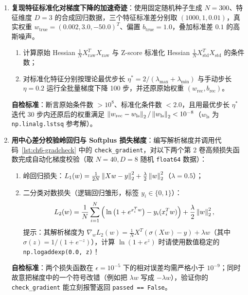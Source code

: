 \begin{enumerate}[label=\textbf{6.\arabic*}, resume]
  \item \textbf{复现特征标准化对梯度下降的加速奇迹}：使用固定随机种子生成 $N=300$、特征维度 $D=3$ 的合成回归数据，三个特征标准差分别取 $(1000, 1, 0.01)$，真实权重 $w_{\text{true}} = (0.002, 3.0, -50.0)^T$、偏置 $b_{\text{true}} = 1.0$，叠加标准差 $0.1$ 的高斯噪声。
  \begin{enumerate}[label=(\alph*)]
    \item 计算原始 Hessian $\frac{1}{N}X_{\text{raw}}^T X_{\text{raw}}$ 与 Z-score 标准化 Hessian $\frac{1}{N}X_{\text{std}}^T X_{\text{std}}$ 的条件数；
    \item 对标准化特征分别按理论最优步长 $\eta^* = 2/(\lambda_{\max}+\lambda_{\min})$ 与手动步长 $\eta = 0.2$ 运行全批量梯度下降 100 步，并还原原始权重 $(w_{\text{rec}}, b_{\text{rec}})$。
  \end{enumerate}
  \textbf{自检标准}：断言原始条件数 $> 10^8$、标准化条件数 $< 2.0$，且用最优步长 $\eta^*$ 迭代 30 步内还原后的权重满足 $\left\|w_{\text{rec}} - w_{\text{ls}}\right\|_2 / \left\|w_{\text{ls}}\right\|_2 < 10^{-8}$（$w_{\text{ls}}$ 为 \texttt{np.linalg.lstsq} 参考解）。

  \item \textbf{用中心差分校验岭回归与 Softplus 损失梯度}：编写解析梯度并调用代码~\ref{lst:ch6-gradcheck} 中的 \texttt{check\_gradient}，对以下两个第 2 卷高频损失函数完成自动化梯度校验（取 $N=40, D=8$ 随机 \texttt{float64} 数据）：
  \begin{enumerate}[label=(\alph*)]
    \item 岭回归损失：$L_1(w) = \frac{1}{2N}\left\|Xw - y\right\|_2^2 + \frac{\lambda}{2}\left\|w\right\|_2^2$（$\lambda = 0.5$）；
    \item 二分类对数损失（逻辑回归雏形，标签 $y_i\in\{0,1\}$）：
    \[
      L_2(w) = \frac{1}{N}\sum_{i=1}^N \Big(\ln\big(1 + e^{x_i^T w}\big) - y_i (x_i^T w)\Big) + \frac{\lambda}{2}\left\|w\right\|_2^2,
    \]
    提示：其解析梯度为 $\nabla_w L_2(w) = \frac{1}{N}X^T(\sigma(Xw) - y) + \lambda w$（其中 $\sigma(z)=1/(1+e^{-z})$），计算 $\ln(1+e^z)$ 时请使用数值稳定的 \texttt{np.logaddexp(0.0, z)}！
  \end{enumerate}
  \textbf{自检标准}：两个损失函数在 $\epsilon = 10^{-5}$ 下的相对误差均需严格小于 $10^{-9}$；同时故意把梯度中的一个符号改错（例如把 $\lambda w$ 写成 $-\lambda w$），验证你的 \texttt{check\_gradient} 能立刻报警返回 \texttt{passed == False}。
\end{enumerate}
